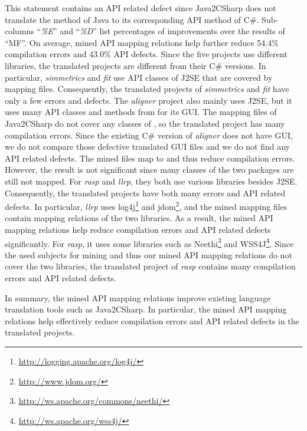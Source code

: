 This statement contains an API related defect since Java2CSharp does not translate the  method of Java to its corresponding API method of C\#. Sub-columns ``\emph{\%E}'' and ``\emph{\%D}'' list
percentages of improvements over the results of ``MF''. On average,
mined API mapping relations help further reduce 54.4\% compilation errors
and 43.0\% API defects. Since the five projects use different libraries,
the translated projects are different from their C\# versions. In particular,
\emph{simmetrics} and \emph{fit} use API classes of J2SE that are
covered by mapping files. Consequently, the translated projects of
\emph{simmetrics} and \emph{fit} have only a few errors and defects. The
\emph{aligner} project also mainly uses J2SE, but it uses many API
classes and methods from  for its GUI. The mapping
files of Java2CSharp do not cover any classes of ,
so the translated project has many compilation errors. Since the existing C\#
version of \emph{aligner} does not have GUI, we do not compare those
defective translated GUI files and we do not find any API related defects. The mined
files map  to  and
thus reduce compilation errors. However, the result is not
significant since many classes of the two packages are still not
mapped. For \emph{rasp} and \emph{llrp}, they both use various
libraries besides J2SE. Consequently, the translated projects have
both many errors and API related defects. In particular, \emph{llrp} uses
log4j\footnote{\url{http://logging.apache.org/log4j/}} and
jdom\footnote{\url{http://www.jdom.org/}}, and the mined mapping
files contain mapping relations of the two libraries. As a result,
the mined API mapping relations help reduce compilation errors and
API related defects significantly. For \emph{rasp}, it uses some libraries such as
Neethi\footnote{\url{http://ws.apache.org/commons/neethi/}} and
WSS4J\footnote{\url{http://ws.apache.org/wss4j/}}. Since the used
subjects for mining and thus our mined API mapping relations do not cover the
two libraries, the translated project of \emph{rasp} contains many
compilation errors and API related defects.

In summary, the mined API mapping relations improve existing language
translation tools such as Java2CSharp. In particular, the mined API
mapping relations help effectively reduce compilation errors and
API related defects in the translated projects.

